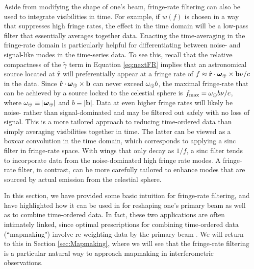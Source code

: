\documentclass[twocolumn,apj,numberedappendix]{emulateapj}
\newcommand{\rhat}{\hat{\mathbf{r}}}
\begin{document}
Aside from modifying the shape of one's beam, fringe-rate filtering can also be used to integrate visibilities in time. For example, if $w(f)$ is chosen in a way that suppresses high fringe rates, the effect in the time domain will be a low-pass filter that essentially averages together data. Enacting the time-averaging in the fringe-rate domain is particularly helpful for differentiating between noise- and signal-like modes in the time-series data. To see this, recall that the relative compactness of the $\tilde{\gamma}$ term in Equation \eqref{eq:nextFR} implies that an astronomical source located at $\rhat$ will preferentially appear at a fringe rate of $f \approx \rhat \cdot \boldsymbol \omega_\Earth \times \mathbf{b} \nu / c $ in the data. Since $\rhat \cdot \boldsymbol \omega_\Earth \times \mathbf{b}$ can never exceed $\omega_\oplus b$, the maximal fringe-rate that can be achieved by a source locked to the celestial sphere is $f_\textrm{max} = \omega_\oplus b \nu / c$, where $\omega_\oplus \equiv | \boldsymbol \omega_\oplus|$ and $b \equiv | \mathbf{b}|$. Data at even higher fringe rates will likely be noise- rather than signal-dominated and may be filtered out safely with no loss of signal. This is a more tailored approach to reducing time-ordered data than simply averaging visibilities together in time. The latter can be viewed as a boxcar convolution in the time domain, which corresponds to applying a sinc filter in fringe-rate space. With wings that only decay as $1/f$, a sinc filter tends to incorporate data from the noise-dominated high fringe rate modes. A fringe-rate filter, in contrast, can be more carefully tailored to enhance modes that are sourced by actual emission from the celestial sphere.

In this section, we have provided some basic intuition for fringe-rate filtering, and have highlighted how it can be used in for reshaping one's primary beam as well as to combine time-ordered data. In fact, these two applications are often intimately linked, since optimal prescriptions for combining time-ordered data (``mapmaking") involve re-weighting data by the primary beam \citep{T97mapmaking,Morales2009,dillon_et_al2015}. We will return to this in Section \ref{sec:Mapmaking}, where we will see that the fringe-rate filtering is a particular natural way to approach mapmaking in interferometric observations.
\end{document}
